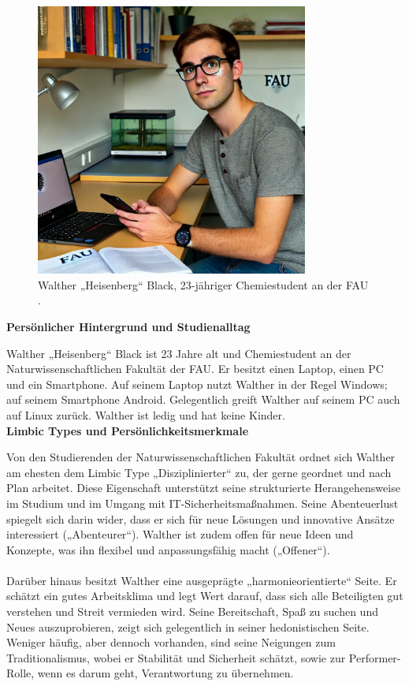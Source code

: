 \documentclass[german,report]{i1thesis}
\begin{document}
\begin{figure}[H]
\centering
\includegraphics[width=0.8\textwidth]{images/maximilian_weber.pdf}
\caption{Walther „Heisenberg“ Black, 23-jähriger Chemiestudent an der FAU \cite{chatgpt2024maximilianweber}.}
\label{fig}
\end{figure}

\textbf{Persönlicher Hintergrund und Studienalltag}

Walther „Heisenberg“ Black ist 23 Jahre alt und Chemiestudent an der Naturwissenschaftlichen Fakultät der FAU. Er besitzt einen Laptop, einen PC und ein Smartphone. Auf seinem Laptop nutzt Walther in der Regel Windows; auf seinem Smartphone Android. Gelegentlich greift Walther auf seinem PC auch auf Linux zurück. Walther ist ledig und hat keine Kinder.\\

\textbf{Limbic Types und Persönlichkeitsmerkmale}

Von den Studierenden der Naturwissenschaftlichen Fakultät ordnet sich Walther am ehesten dem Limbic Type „Disziplinierter“ zu, der gerne geordnet und nach Plan arbeitet. Diese Eigenschaft unterstützt seine strukturierte Herangehensweise im Studium und im Umgang mit IT-Sicherheitsmaßnahmen. Seine Abenteuerlust spiegelt sich darin wider, dass er sich für neue Lösungen und innovative Ansätze interessiert („Abenteurer“). Walther ist zudem offen für neue Ideen und Konzepte, was ihn flexibel und anpassungsfähig macht („Offener“).\\
\\
Darüber hinaus besitzt Walther eine ausgeprägte „harmonieorientierte“ Seite. Er schätzt ein gutes Arbeitsklima und legt Wert darauf, dass sich alle Beteiligten gut verstehen und Streit vermieden wird. Seine Bereitschaft, Spaß zu suchen und Neues auszuprobieren, zeigt sich gelegentlich in seiner hedonistischen Seite. Weniger häufig, aber dennoch vorhanden, sind seine Neigungen zum Traditionalismus, wobei er Stabilität und Sicherheit schätzt, sowie zur Performer-Rolle, wenn es darum geht, Verantwortung zu übernehmen.\\
\end{document}
